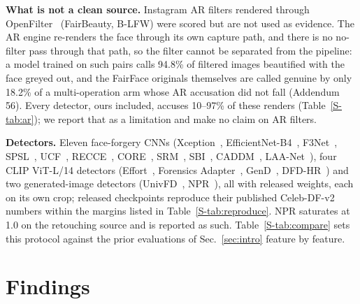\documentclass[conference]{IEEEtran}
\begin{document}
\textbf{What is not a clean source.} Instagram AR filters rendered through OpenFilter~\cite{openfilter2022} (FairBeauty,
B-LFW) were scored but are not used as evidence. The AR engine re-renders the face through its own capture path, and there
is no no-filter pass through that path, so the filter cannot be separated from the pipeline: a model trained on such pairs
calls 94.8\% of filtered images beautified with the face greyed out,
and the FairFace originals themselves are called genuine by only 18.2\% of a multi-operation arm whose AR accusation did
not fall (Addendum 56).
Every detector, ours included, accuses 10--97\% of these renders (Table~\ref{S-tab:ar}); we report that as a limitation and
make no claim on AR filters.

\textbf{Detectors.} Eleven face-forgery CNNs (Xception~\cite{xception}, EfficientNet-B4~\cite{efficientnet},
F3Net~\cite{f3net}, SPSL~\cite{spsl}, UCF~\cite{ucf}, RECCE~\cite{recce}, CORE~\cite{core}, SRM~\cite{srm}, SBI~\cite{sbi},
CADDM~\cite{caddm}, LAA-Net~\cite{laanet}), four CLIP ViT-L/14 detectors (Effort~\cite{effort}, Forensics
Adapter~\cite{forensicsadapter}, GenD~\cite{gend2026}, DFD-HR~\cite{dfdhr2026}) and two generated-image detectors
(UnivFD~\cite{univfd}, NPR~\cite{npr}), all with released weights, each on its own crop; released checkpoints reproduce
their published Celeb-DF-v2 numbers within the margins listed in Table~\ref{S-tab:reproduce}. NPR saturates at 1.0 on the
retouching source and is reported as such. Table~\ref{S-tab:compare} sets this protocol against the prior evaluations of
Sec.~\ref{sec:intro} feature by feature.


\section{Findings}
\label{sec:findings}
\end{document}
